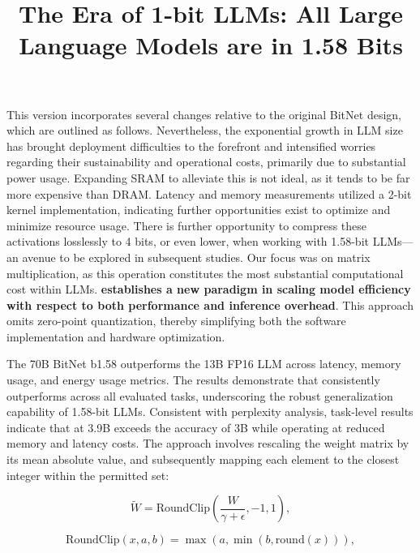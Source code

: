 \title{The Era of 1-bit LLMs: All Large Language Models are in 1.58 Bits}
This version incorporates several changes relative to the original BitNet design, which are outlined as follows. Nevertheless, the exponential growth in LLM size has brought deployment difficulties to the forefront and intensified worries regarding their sustainability and operational costs, primarily due to substantial power usage. Expanding SRAM to alleviate this is not ideal, as it tends to be far more expensive than DRAM. Latency and memory measurements utilized a 2-bit kernel implementation, indicating further opportunities exist to optimize and minimize resource usage. There is further opportunity to compress these activations losslessly to 4 bits, or even lower, when working with 1.58-bit LLMs—an avenue to be explored in subsequent studies. Our focus was on matrix multiplication, as this operation constitutes the most substantial computational cost within LLMs. \textbf{ establishes a new paradigm in scaling model efficiency with respect to both performance and inference overhead}. This approach omits zero-point quantization, thereby simplifying both the software implementation and hardware optimization. \item The 70B BitNet b1.58 outperforms the 13B FP16 LLM across latency, memory usage, and energy usage metrics. The results demonstrate that  consistently outperforms across all evaluated tasks, underscoring the robust generalization capability of 1.58-bit LLMs. Consistent with perplexity analysis, task-level results indicate that  at 3.9B exceeds the accuracy of  3B while operating at reduced memory and latency costs. The approach involves rescaling the weight matrix by its mean absolute value, and subsequently mapping each element to the closest integer within the permitted set:

\begin{equation}
    \widetilde{W} = \mathrm{RoundClip}(\frac{W}{\gamma + \epsilon}, -1, 1),
\end{equation}

\begin{equation}
    \mathrm{RoundClip}(x, a, b) = \max(a, \min(b, \mathrm{round}(x))),
\end{equation}

